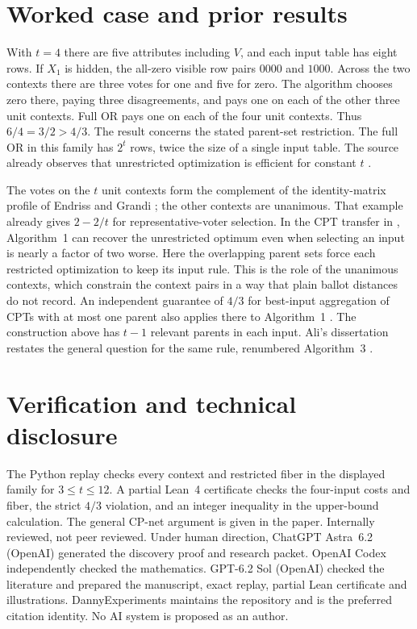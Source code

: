 \documentclass[11pt]{amsart}
\begin{document}
\section{Worked case and prior results}
With \(t=4\) there are five attributes including \(V\), and each
input table has eight rows. If \(X_1\) is hidden, the all-zero
visible row pairs \(0000\) and \(1000\). Across the two contexts
there are three votes for one and five for zero. The algorithm chooses
zero there, paying three disagreements, and pays one on each of the
other three unit contexts. Full OR pays one on each of the four unit
contexts. Thus \(6/4=3/2>4/3\). The result concerns the stated
parent-set restriction. The full OR in this family has \(2^t\) rows,
twice the size of a single input table. The source already observes
that unrestricted optimization is efficient for constant \(t\)
\cite[Proposition~3]{ayz}.

The votes on the \(t\) unit contexts form the complement of the
identity-matrix profile of Endriss and Grandi
\cite[Example~2]{eg}; the other contexts are unanimous. That example
already gives \(2-2/t\) for representative-voter selection. In the
CPT transfer in \cite[Theorems~16--17]{ayz}, Algorithm~1 can recover
the unrestricted optimum even when selecting an input is nearly a
factor of two worse. Here the overlapping parent sets force each
restricted optimization to keep its input rule. This is the role of
the unanimous contexts, which constrain the context pairs in a way
that plain ballot distances do not record. An independent guarantee
of \(4/3\) for best-input aggregation of CPTs with at most one parent
also applies there to Algorithm~1 \cite[Theorem~5.1]{aoyz}. The
construction above has \(t-1\) relevant parents in each input.
Ali's dissertation restates the general question for the same rule,
renumbered Algorithm~3 \cite[Sec.~3.7]{aliThesis}.

\clearpage
\section*{Verification and technical disclosure}
The Python replay checks every context and restricted fiber in the
displayed family for \(3\le t\le12\). A partial Lean~4 certificate
checks the four-input costs and fiber, the strict \(4/3\) violation,
and an integer inequality in the upper-bound calculation. The
general CP-net argument is given in the paper. Internally reviewed,
not peer reviewed. Under human direction, ChatGPT Astra~6.2 (OpenAI)
generated the discovery proof and research packet. OpenAI Codex
independently checked the mathematics. GPT-6.2 Sol (OpenAI) checked
the literature and prepared the manuscript, exact replay, partial
Lean certificate and illustrations. DannyExperiments maintains the
repository and is the preferred citation identity. No AI system is
proposed as an author.
\end{document}
